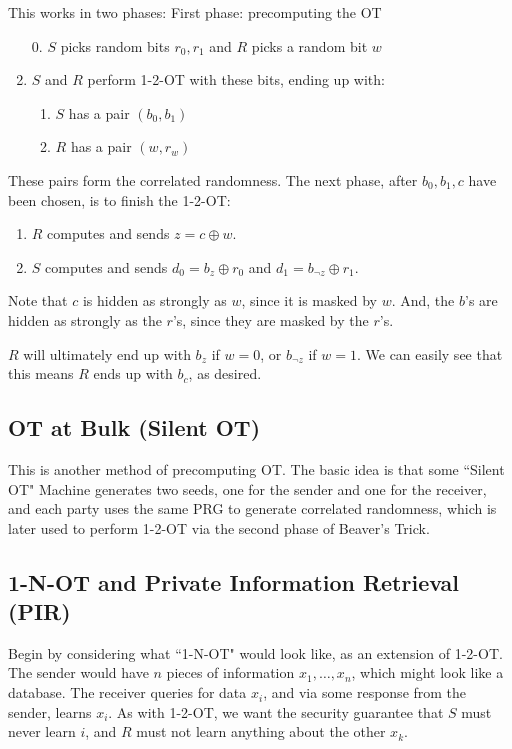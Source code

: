 \documentclass[11pt]{article}
\begin{document}
This works in two phases:
First phase: precomputing the OT
\begin{enumerate}
\item [0.] \(S\) picks random bits \(r_0,r_1\) and \(R\) picks a random bit \(w\)
\item \(S\) and \(R\) perform 1-2-OT with these bits, ending up with:
\begin{enumerate}
\item \(S\) has a pair \((b_0,b_1)\)
\item \(R\) has a pair \((w,r_w)\)
\end{enumerate}
\end{enumerate}
These pairs form the correlated randomness.
The next phase, after \(b_0,b_1,c\) have been chosen, is to finish the 1-2-OT:
\begin{enumerate}
\item \(R\)  computes and sends \(z=c\oplus w\).
\item \(S\) computes and sends \(d_0 = b_z\oplus r_0\) and \(d_1= b_{\neg z}\oplus r_1\).
\end{enumerate}
Note that \(c\) is hidden as strongly as \(w\), since it is masked by \(w\).
And, the \(b\)'s are hidden as strongly as the \(r\)'s, since they are masked by the \(r\)'s.

\(R\) will ultimately end up with \(b_z\) if \(w=0\), or \(b_{\neg z}\) if \(w=1\).
We can easily see that this means \(R\) ends up with \(b_c\), as desired.

\subsection{OT at Bulk (Silent OT)}
This is another method of precomputing OT.
The basic idea is that some ``Silent OT" Machine generates two seeds,
one for the sender and one for the receiver,
and each party uses the same PRG to generate correlated randomness,
which is later used to perform 1-2-OT via the second phase of Beaver's Trick.

\subsection{1-N-OT and Private Information Retrieval (PIR)}
Begin by considering what ``1-N-OT" would look like, as an extension of 1-2-OT.
The sender would have \(n\) pieces of information \(x_1,\ldots,x_n\), which might look like a database.
The receiver queries for data \(x_i\), and via some response from the sender, learns \(x_i\).
As with 1-2-OT, we want the security guarantee that \(S\) must never learn \(i\),
and \(R\) must not learn anything about the other \(x_k\).\bigskip
\end{document}

